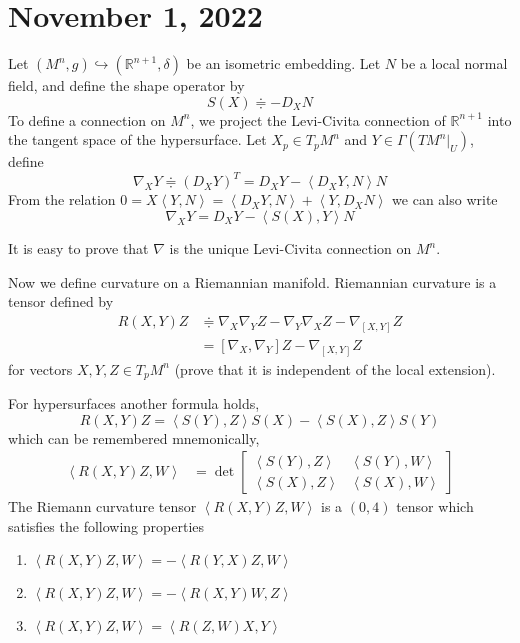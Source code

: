 \documentclass[12pt,a4paper]{article}
\theoremstyle{definition}
\theoremstyle{greenbox}
\newcommand{\define}{\doteqdot}
\newcommand{\Rn}{\mathbb{R}^{n+1}}
\begin{document}
    \section{November 1, 2022}
    Let $ (M^{n},g) \hookrightarrow (\Rn, \delta) $ be an isometric embedding. Let $ N $ be a local normal field, and define the shape operator by
    \[ S(X) \define - D_{X}N \]
    To define a connection on $ M^{n} $, we project the Levi-Civita connection of $ \Rn $ into the tangent space of the hypersurface. Let $ X_{p} \in T_{p}M^{n} $ and $ Y \in \Gamma(TM^{n}|_{U}) $, define 
    \[ \nabla_{X}Y \define (D_{X}Y)^{T} = D_{X}Y - \left< D_{X}Y,N \right>N \]
    From the relation $ 0 = X \left< Y,N \right> = \left< D_{X}Y,N \right> + \left< Y,D_{X}N \right> $ we can also write 
    \[ \nabla_{X}Y = D_{X}Y - \left< S(X),Y \right>N \]
    
    It is easy to prove that $ \nabla $ is the unique Levi-Civita connection on $ M^{n} $.
    
    Now we define curvature on a Riemannian manifold. Riemannian curvature is a tensor defined by 
    \begin{align*}
        R(X,Y)Z & \define \nabla_{X} \nabla_{Y}Z - \nabla_{Y}\nabla_{X}Z - \nabla_{[X,Y]}Z\\
        & = [\nabla_{X},\nabla_{Y}]Z - \nabla_{[X,Y]}Z
    \end{align*}
    for vectors $ X,Y,Z \in T_{p}M^{n} $ (prove that it is independent of the local extension).
    
    For hypersurfaces another formula holds, 
    \[ R(X,Y)Z = \left< S(Y),Z \right>S(X) - \left< S(X),Z \right>S(Y) \]
    which can be remembered mnemonically, 
    \begin{align*}
        \left< R(X,Y)Z,W \right> &= \det \begin{bmatrix}
            \left< S(Y),Z \right> & \left< S(Y),W \right>\\ 
            \left< S(X),Z \right> & \left< S(X),W \right>
        \end{bmatrix} 
    \end{align*}
    The Riemann curvature tensor $ \left< R(X,Y)Z,W \right> $ is a $ (0,4) $ tensor which satisfies the following properties   
    \begin{enumerate}
        
        \item $ \left< R(X,Y)Z,W \right> = - \left< R(Y,X)Z,W \right> $
        \item $ \left< R(X,Y)Z,W \right> = - \left< R(X,Y)W,Z \right> $
        \item $ \left< R(X,Y)Z,W \right> = \left< R(Z,W)X,Y \right> $
    \end{enumerate}
\end{document}
